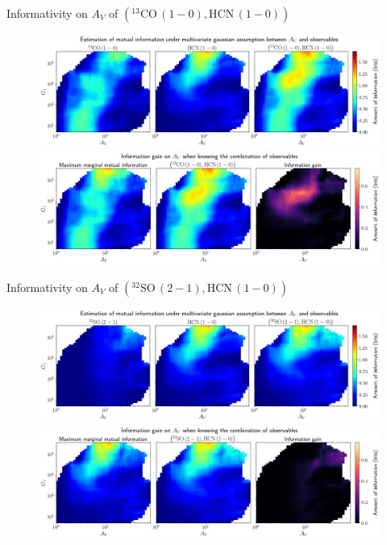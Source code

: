 \documentclass{beamer}
\begin{document}
\begin{frame}{Informativity on $A_V$ of $\left(\mathrm{^{13}CO\,(1-0)},\mathrm{HCN\,(1-0)}\right)$}
    \begin{figure}
        \centering
        \includegraphics[width=0.95\linewidth]{../linearinfogauss/av__13co10_hcn10_linearinfogauss.png}
        \vfill
        \includegraphics[width=0.95\linewidth]{../linearinfogauss/av__13co10_hcn10_linearinfogauss_gain.png}
    \end{figure}
\end{frame}

\begin{frame}{Informativity on $A_V$ of $\left(\mathrm{^{32}SO\,(2-1)},\mathrm{HCN\,(1-0)}\right)$}
    \begin{figure}
        \centering
        \includegraphics[width=0.95\linewidth]{../linearinfogauss/av__32so21_hcn10_linearinfogauss.png}
        \vfill
        \includegraphics[width=0.95\linewidth]{../linearinfogauss/av__32so21_hcn10_linearinfogauss_gain.png}
    \end{figure}
\end{frame}
\end{document}

